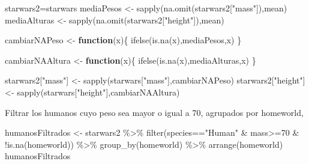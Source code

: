 \documentclass[
]{book}
\newenvironment{Shaded}{\begin{snugshade}}{\end{snugshade}}
\newcommand{\ControlFlowTok}[1]{\textcolor[rgb]{0.13,0.29,0.53}{\textbf{#1}}}
\newcommand{\DecValTok}[1]{\textcolor[rgb]{0.00,0.00,0.81}{#1}}
\newcommand{\FunctionTok}[1]{\textcolor[rgb]{0.00,0.00,0.00}{#1}}
\newcommand{\NormalTok}[1]{#1}
\newcommand{\OtherTok}[1]{\textcolor[rgb]{0.56,0.35,0.01}{#1}}
\newcommand{\SpecialCharTok}[1]{\textcolor[rgb]{0.00,0.00,0.00}{#1}}
\newcommand{\StringTok}[1]{\textcolor[rgb]{0.31,0.60,0.02}{#1}}
\begin{document}
\begin{Shaded}
\begin{Highlighting}[]
\NormalTok{starwars2}\OtherTok{=}\NormalTok{starwars}
\NormalTok{mediaPesos }\OtherTok{\textless{}{-}} \FunctionTok{sapply}\NormalTok{(}\FunctionTok{na.omit}\NormalTok{(starwars2[}\StringTok{"mass"}\NormalTok{]),mean)}
\NormalTok{mediaAlturas }\OtherTok{\textless{}{-}} \FunctionTok{sapply}\NormalTok{(}\FunctionTok{na.omit}\NormalTok{(starwars2[}\StringTok{"height"}\NormalTok{]),mean)}

\NormalTok{cambiarNAPeso }\OtherTok{\textless{}{-}} \ControlFlowTok{function}\NormalTok{(x)\{}
  \FunctionTok{ifelse}\NormalTok{(}\FunctionTok{is.na}\NormalTok{(x),mediaPesos,x)}
\NormalTok{\}}

\NormalTok{cambiarNAAltura }\OtherTok{\textless{}{-}} \ControlFlowTok{function}\NormalTok{(x)\{}
  \FunctionTok{ifelse}\NormalTok{(}\FunctionTok{is.na}\NormalTok{(x),mediaAlturas,x)}
\NormalTok{\}}

\NormalTok{starwars2[}\StringTok{"mass"}\NormalTok{] }\OtherTok{\textless{}{-}} \FunctionTok{sapply}\NormalTok{(starwars[}\StringTok{"mass"}\NormalTok{],cambiarNAPeso)}
\NormalTok{starwars2[}\StringTok{"height"}\NormalTok{] }\OtherTok{\textless{}{-}} \FunctionTok{sapply}\NormalTok{(starwars[}\StringTok{"height"}\NormalTok{],cambiarNAAltura)}
\end{Highlighting}
\end{Shaded}

Filtrar los humanos cuyo peso sea mayor o igual a 70, agrupados por homeworld,

\begin{Shaded}
\begin{Highlighting}[]
\NormalTok{humanosFiltrados }\OtherTok{\textless{}{-}}\NormalTok{ starwars2 }\SpecialCharTok{\%\textgreater{}\%} \FunctionTok{filter}\NormalTok{(species}\SpecialCharTok{==}\StringTok{"Human"} \SpecialCharTok{\&}\NormalTok{ mass}\SpecialCharTok{\textgreater{}=}\DecValTok{70} \SpecialCharTok{\&} \SpecialCharTok{!}\FunctionTok{is.na}\NormalTok{(homeworld)) }\SpecialCharTok{\%\textgreater{}\%} \FunctionTok{group\_by}\NormalTok{(homeworld) }\SpecialCharTok{\%\textgreater{}\%} \FunctionTok{arrange}\NormalTok{(homeworld)}
\NormalTok{humanosFiltrados}
\end{Highlighting}
\end{Shaded}
\end{document}

